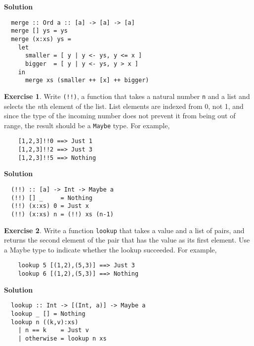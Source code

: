 \documentclass[11pt,a4paper]{article}
\theoremstyle{definition}
\newtheorem{exr}{Exercise}
\begin{document}
\textbf{Solution}
\begin{lstlisting}
  merge :: Ord a :: [a] -> [a] -> [a]
  merge [] ys = ys
  merge (x:xs) ys = 
    let 
      smaller = [ y | y <- ys, y <= x ]
      bigger  = [ y | y <- ys, y > x ]
    in
      merge xs (smaller ++ [x] ++ bigger)
\end{lstlisting}



\vspace{5mm}

\begin{exr}
  Write \texttt{(!!)}, a function that takes a natural number \texttt{n} 
  and a list and selects the \emph{n}th element of the list. List elements
  are indexed from 0, not 1, and since the type of the incoming number 
  does not prevent it from being out of range, the result should be 
  a \texttt{Maybe} type. For example,

  \begin{lstlisting}
    [1,2,3]!!0 ==> Just 1
    [1,2,3]!!2 ==> Just 3
    [1,2,3]!!5 ==> Nothing
  \end{lstlisting}
\end{exr}

\textbf{Solution}
\begin{lstlisting}
  (!!) :: [a] -> Int -> Maybe a
  (!!) [] _     = Nothing
  (!!) (x:xs) 0 = Just x
  (!!) (x:xs) n = (!!) xs (n-1)
\end{lstlisting}


\vspace{5mm}

\begin{exr}
  Write a function \texttt{lookup} that takes a value and a list of pairs, 
  and returns the second element of the pair that has the value as its 
  first element. Use a Maybe type to indicate whether the lookup succeeded. 
  For example,

  \begin{lstlisting}
    lookup 5 [(1,2),(5,3)] ==> Just 3
    lookup 6 [(1,2),(5,3)] ==> Nothing
  \end{lstlisting}
\end{exr}

\textbf{Solution}
\begin{lstlisting}
  lookup :: Int -> [(Int, a)] -> Maybe a
  lookup _ [] = Nothing
  lookup n ((k,v):xs)
    | n == k    = Just v
    | otherwise = lookup n xs
\end{lstlisting}
\end{document}
